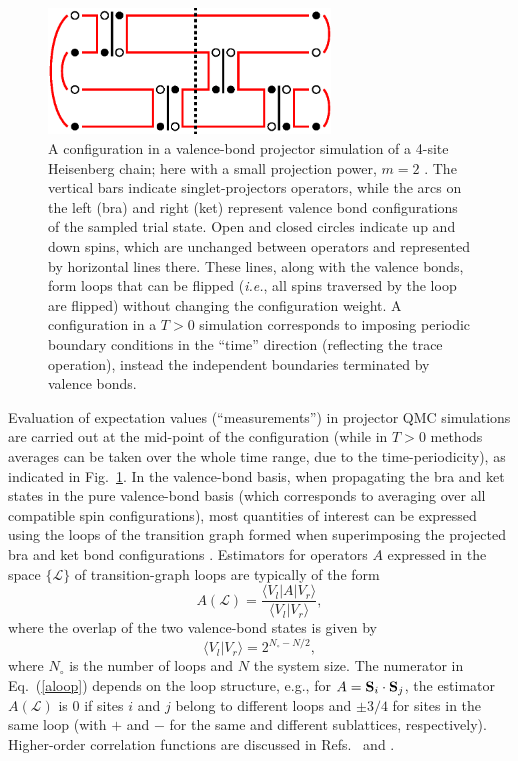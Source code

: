 \documentclass[10pt,pre,aps,twocolumn,showpacs,subscriptaddresses,floatfix]{revtex4}
\begin{document}
\begin{figure}
\includegraphics[width=7.5cm, clip]{fig01.eps}
\caption{A configuration in a valence-bond projector simulation of a 4-site Heisenberg chain; here with a small projection power, 
$m=2$ \cite{Sandvik10a}. The vertical bars indicate singlet-projectors operators, while the arcs on the left (bra) and right (ket) represent 
valence bond configurations of the sampled trial state. Open and closed circles indicate up and down spins, which are unchanged between 
operators and represented by horizontal lines there. These lines, along with the valence bonds, form loops that can be flipped ({\em i.e.}, 
all spins traversed by the loop are flipped) without changing the configuration weight. A configuration in a $T>0$ simulation corresponds 
to imposing periodic boundary conditions in the ``time'' direction (reflecting the trace operation), instead the independent boundaries 
terminated by valence bonds.}
\label{loops}
\end{figure}

Evaluation of expectation values (``measurements'') in projector QMC simulations are carried out at the mid-point of the configuration (while in $T>0$
methods averages can be taken over the whole time range, due to the time-periodicity), as indicated 
in Fig.~\ref{loops}. In the valence-bond basis, when propagating the bra and ket states in the pure valence-bond basis (which corresponds to averaging 
over all compatible spin configurations), most quantities of interest can be expressed using the loops of the transition graph formed when superimposing 
the projected bra and ket bond configurations \cite{Liang88,Sutherland88}. Estimators for operators $A$ expressed in the space $\{\mathcal{L}\}$ of 
transition-graph loops are typically of the form
\begin{equation}
A(\mathcal{L}) = \frac{\langle V_l|A|V_r\rangle}{\langle V_l|V_r \rangle},
\label{aloop}
\end{equation}
where the overlap of the two valence-bond states is given by
\begin{equation}
\langle V_l|V_r\rangle = 2^{N_\circ - N/2},
\label{vboverlap}
\end{equation}
where $N_\circ$ is the number of loops and $N$ the system size. The numerator in Eq.~(\ref{aloop}) depends on the loop structure, 
e.g., for $A={\bf S}_i \cdot {\bf S}_j$, the estimator $A(\mathcal{L})$ is $0$ if sites $i$ and $j$ belong to different loops and $\pm 3/4$ for 
sites in the same loop (with $+$ and $-$ for the same and different sublattices, respectively). Higher-order correlation functions are discussed 
in Refs.~\cite{Beach06} and \cite{Tang11b}.
\end{document}
